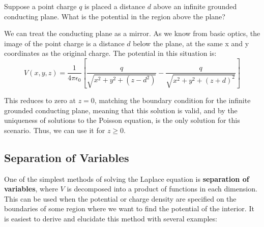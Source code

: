 \documentclass{article}
\begin{document}
\begin{eg}
    Suppose a point charge \(q\) is placed a distance \(d\) above an infinite grounded conducting plane. What 
    is the potential in the region above the plane?  
\end{eg}
\begin{answer}
    We can treat the conducting plane as a mirror. As we know from basic optics, the image of the point charge is a distance \(d\) below the plane, at the same 
    x and y coordinates as the original charge. The potential in this situation is:
    \[
        V(x,y,z)=\frac{1}{4 \pi \epsilon_0}[\frac{q}{\sqrt{x^2+y^2+(z-d^2)}}-\frac{q}{\sqrt{x^2+y^2+(z+d)^2}}]
    \] 

    This reduces to zero at \(z=0\), matching the boundary condition for the infinite grounded conducting plane, meaning that 
    this solution is valid, and by the uniqueness of solutions to the Poisson equation, is the only solution for this scenario. Thus, we can use 
    it for \(z\geq 0\). 
\end{answer}
\subsection{Separation of Variables}
One of the simplest methods of solving the Laplace equation is \textbf{separation of variables}, where \(V\) is decomposed into a product of 
functions in each dimension. This can be used when the potential or charge density are specified on the boundaries of some region where we want to find 
the potential of the interior. It is easiest to derive and elucidate this method with several examples:
\end{document}
